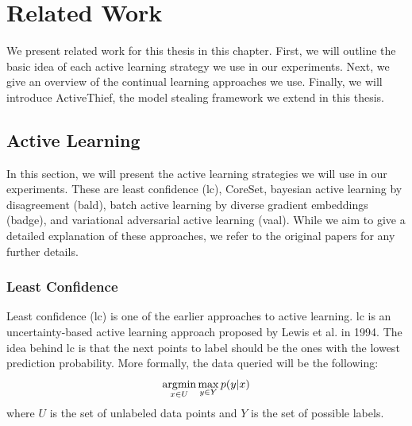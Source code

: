 
\chapter{Related Work}
\label{ch:Related_work}
We present related work for this thesis in this chapter. First, we will outline the basic idea of each active learning strategy we
use in our experiments. Next, we give an overview of the continual learning approaches we use. Finally, we will introduce ActiveThief, the
model stealing framework we extend in this thesis.


\section{Active Learning}
\label{sec:Related_work:Active_Learning}
In this section, we will present the active learning strategies we will use in our experiments. These are least confidence
(\gls{lc}), CoreSet, bayesian active learning by disagreement (\gls{bald}), batch active learning by diverse gradient embeddings (\gls{badge}), and 
variational adversarial active learning (\gls{vaal}). While we aim to give a detailed explanation of these approaches, we refer to the
original papers for any further details. \par

\subsection{Least Confidence}
\label{sec:Related_work:Active_Learning:Least_Confidence}
Least confidence (\gls{lc}) is one of the earlier approaches to active learning. \gls{lc} is an uncertainty-based active learning
approach proposed by Lewis et al. \cite{lewis1995sequential} in 1994. The idea behind \gls{lc} is that the next points to label should be the 
ones with the lowest prediction probability. More formally, the data queried will be the following:
\begin{equation}
    \operatorname*{\arg\!\min}_{x \in U} \max_{y \in Y} p(y|x)
\end{equation}
where $U$ is the set of unlabeled data points and $Y$ is the set of possible labels. \par

